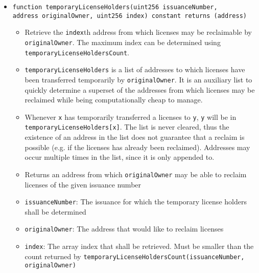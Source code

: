 \documentclass[a4paper]{article}
\begin{document}
\begin{itemize}
  \item \texttt{function temporaryLicenseHolders(uint256 issuanceNumber, \\address originalOwner, uint256 index) constant returns (address)}
  \begin{itemize}
    \item Retrieve the \texttt{index}th address from which licenses may be reclaimable by \texttt{originalOwner}. The maximum index can be determined using \texttt{temporaryLicenseHoldersCount}.
    \item \texttt{temporaryLicenseHolders} is a list of addresses to which licenses have been transferred temporarily by \texttt{originalOwner}. It is an auxiliary list to quickly determine a superset of the addresses from which licenses may be reclaimed while being computationally cheap to manage.
    \item Whenever \texttt{x} has temporarily transferred a licenses to \texttt{y}, \texttt{y} will be in \texttt{temporaryLicenseHolders[x]}. The list is  never cleared, thus the existence of an address in the list does not guarantee that a reclaim is possible (e.g. if the licenses has already been reclaimed). Addresses may occur multiple times in the list, since it is only appended to.
    \item Returns an address from which \texttt{originalOwner} may be able to reclaim licenses of the given issuance number
    \item \texttt{issuanceNumber}: The issuance for which the temporary license holders shall be determined
    \item \texttt{originalOwner}: The address that would like to reclaim licenses
    \item \texttt{index}: The array index that shall be retrieved. Must be smaller than the count returned by \texttt{temporaryLicenseHoldersCount(issuanceNumber, originalOwner)}
  \end{itemize}
  

\end{itemize}
\end{document}
